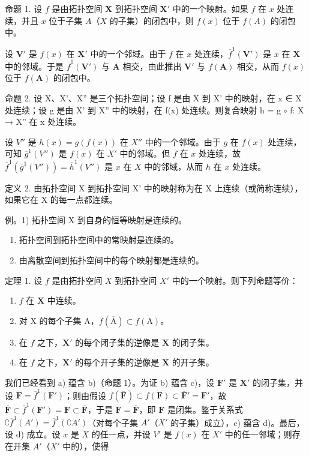 命题 1. 设 \(f\) 是由拓扑空间 \(\mathbf{X}\) 到拓扑空间 \(\mathbf{X}'\) 中的一个映射。如果 \(f\) 在 \(x\) 处连续，并且 \(x\) 位于子集 \(A\)（\(X\) 的子集）的闭包中，则 \(f(x)\) 位于 \(f(A)\) 的闭包中。

设 \(\mathbf{V}'\) 是 \(f(x)\) 在 \(\mathbf{X}'\) 中的一个邻域。由于 \(f\) 在 \(x\) 处连续，\(\overline{f}^1 (\mathbf{V}')\) 是 \(x\) 在 \(\mathbf{X}\) 中的邻域。于是 \(\overline{f}^1 (\mathbf{V}')\) 与 \(\mathbf{A}\) 相交，由此推出 \(\mathbf{V}'\) 与 \(f(\mathbf{A})\) 相交，从而 \(f(x)\) 位于 \(f(\mathbf{A})\) 的闭包中。

命题 2. 设 X、X'、X'' 是三个拓扑空间；设 f 是由 X 到 X' 中的映射，在 x ∈ X 处连续；设 g 是由 X' 到 X'' 中的映射，在 f(x) 处连续。则复合映射 h = g \(\circ\) f: X → X'' 在 x 处连续。

设 \(V''\) 是 \(h(x) = g(f(x))\) 在 \(X''\) 中的一个邻域。由于 \(g\) 在 \(f(x)\) 处连续，可知 \(\overline{g}^1(V'')\) 是 \(f(x)\) 在 \(X'\) 中的邻域。但 \(f\) 在 \(x\) 处连续，故 \(\overline{f}^1(\overline{g}^1(V'')) = \overline{h}^1(V'')\) 是 \(x\) 在 \(X\) 中的邻域，从而 \(h\) 在 \(x\) 处连续。

定义 2. 由拓扑空间 X 到拓扑空间 X' 中的映射称为在 X 上连续（或简称连续），如果它在 X 的每一点都连续。

例。1) 拓扑空间 X 到自身的恒等映射是连续的。

\begin{enumerate}
\def\labelenumi{\arabic{enumi})}
\setcounter{enumi}{1}
\item
  拓扑空间到拓扑空间中的常映射是连续的。
\item
  由离散空间到拓扑空间中的每个映射都是连续的。
\end{enumerate}

定理 1. 设 \(f\) 是由拓扑空间 \(X\) 到拓扑空间 \(X'\) 中的一个映射。则下列命题等价：

\begin{enumerate}
\def\labelenumi{\alph{enumi})}
\item
  \(f\) 在 \(\mathbf{X}\) 中连续。
\item
  对 X 的每个子集 A，\(f(\overline{\mathrm{A}}) \subset \overline{f(\mathrm{A})}\)。
\item
  在 \(f\) 之下，\(\mathbf{X}'\) 的每个闭子集的逆像是 \(\mathbf{X}\) 的闭子集。
\item
  在 \(f\) 之下，\(\mathbf{X}'\) 的每个开子集的逆像是 \(\mathbf{X}\) 的开子集。
\end{enumerate}

我们已经看到 a) 蕴含 b)（命题 1）。为证 b) 蕴含 c)，设 \(\mathbf{F}'\) 是 \(\mathbf{X}'\) 的闭子集，并设 \(\mathbf{F} = \overline{f}^{1}(\mathbf{F}')\)；则由假设 \(f(\overline{\mathbf{F}}) \subset \overline{f(\mathbf{F})} \subset \overline{\mathbf{F}}' = \mathbf{F}'\)，故 \(\overline{\mathbf{F}} \subset \overline{f}^{1}(\mathbf{F}') = \mathbf{F} \subset \overline{\mathbf{F}}\)，于是 \(\mathbf{F} = \overline{\mathbf{F}}\)，即 \(\mathbf{F}\) 是闭集。鉴于关系式 \(\complement \overline{f}^{1}(A') = \overline{f}^{1}(\complement A')\)（对每个子集 \(A'\)（\(X'\) 的子集）成立），c) 蕴含 d)。最后，设 d) 成立。设 \(x\) 是 \(X\) 的任一点，并设 \(V'\) 是 \(f(x)\) 在 \(X'\) 中的任一邻域；则存在开集 \(A'\)（\(X'\) 中的），使得

